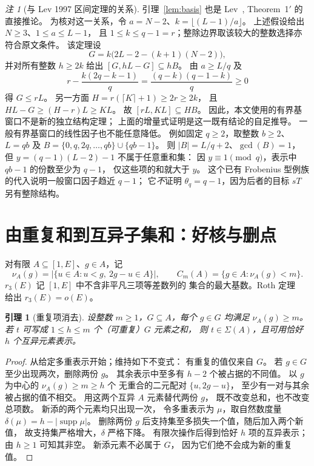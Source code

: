 \documentclass[UTF8,a4paper,11pt,fontset=none]{ctexart}
\newtheorem{lemma}[theorem]{引理}
\theoremstyle{remark}
\newtheorem{remark}[theorem]{注}
\newcommand{\sig}{\Sigma}
\newcommand{\gcdop}{\operatorname{gcd}}
\begin{document}
\begin{remark}[与 Lev 1997 区间定理的关系]\label{rem:lev1997}
引理~\ref{lem:basis} 也是 Lev~\cite{Lev1997}, Theorem~1$'$ 的直接推论。
为核对这一关系，令 $a=N-2$、$k=\lfloor(L-1)/a\rfloor$。
上述假设给出 $N\ge3$、$1\le a\le L-1$，
且 $1\le k\le q-1=r$；整除边界取该较大的整数选择亦符合原文条件。
该定理设
\[
 G=k\bigl(2L-2-(k+1)(N-2)\bigr),
\]
并对所有整数 $h\ge2k$ 给出 $[G,hL-G]\subseteq hB$。
由 $a\ge L/q$ 及
\[
 r-\frac{k(2q-k-1)}q=\frac{(q-k)(q-1-k)}q\ge0
\]
得 $G\le rL$。
另一方面 $H=r(\lceil K\rceil+1)\ge2r\ge2k$，
且 $HL-G\ge(H-r)L\ge KL$。
故 $[rL,KL]\subseteq HB$。
因此，本文使用的有界基窗口不是新的独立结构定理；
上面的增量式证明是这一既有结论的自足推导。
一般有界基窗口的线性因子也不能任意降低。
例如固定 $q\ge2$，取整数 $b\ge2$、$L=qb$ 及
$B=\{0,q,2q,\ldots,qb\}\cup\{qb-1\}$。
则 $|B|=L/q+2$、$\gcdop(B)=1$，
但 $y=(q-1)(L-2)-1$ 不属于任意重和集：
因 $y\equiv1\pmod q$，表示中 $qb-1$ 的份数至少为 $q-1$，
仅这些项的和就大于 $y$。
这个已有 Frobenius 型例族的代入说明一般窗口因子趋近 $q-1$；
它\emph{不}证明 $\theta_q=q-1$，因为后者的目标 $sT$ 另有整除结构。
\end{remark}

\section{由重复和到互异子集和：好核与删点}
对有限 $A\subseteq[1,E]$、$g\in A$，记
\[
 \nu_A(g)=
 \bigl|\{u\in A:u<g,\ 2g-u\in A\}\bigr|,\qquad
 C_m(A)=\{g\in A:\nu_A(g)<m\}.
\]
$r_3(E)$ 记 $[1,E]$ 中不含非平凡三项等差数列的
集合的最大基数。Roth 定理~\cite{Roth1953} 给出
$r_3(E)=o(E)$。

\begin{lemma}[重复项消去]\label{lem:distinct}
设整数 $m\ge1$，$G\subseteq A$，每个 $g\in G$
均满足 $\nu_A(g)\ge m$。
若 $t$ 可写成 $1\le h\le m$ 个（可重复）$G$ 元素之和，
则 $t\in\sig(A)$，且可用恰好 $h$ 个互异元素表示。
\end{lemma}
\begin{proof}
从给定多重表示开始；维持如下不变式：
有重复的值仅来自 $G$。
若 $g\in G$ 至少出现两次，删除两份 $g$。
其余表示中至多有 $h-2$ 个被占据的不同值。
以 $g$ 为中心的 $\nu_A(g)\ge m\ge h$ 个
无重合的二元配对 $\{u,2g-u\}$，
至少有一对与其余被占据的值不相交。
用这两个互异 $A$ 元素替代两份 $g$，
既不改变总和，也不改变总项数。
新添的两个元素均只出现一次，
令多重表示为 $\mu$，取自然数度量
$\delta(\mu)=h-|\operatorname{supp}\mu|$。
删除两份 $g$ 后支持集至多损失一个值，随后加入两个新值，
故支持集严格增大，$\delta$ 严格下降。
有限次操作后得到恰好 $h$ 项的互异表示；由 $h\ge1$ 可知其非空。
新添元素不必属于 $G$，
因为它们绝不会成为新的重复值。
\end{proof}
\end{document}
